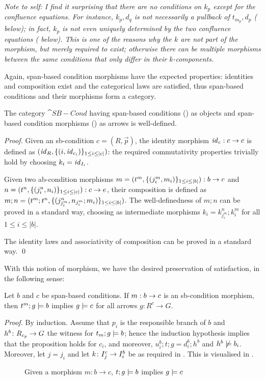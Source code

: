 \medskip\noindent
\emph{Note to self: I find it surprising that there are no conditions on $k_p$ except for the confluence equations. For instance, $k_p,d_q$ is \emph{not} necessarily a pullback of $t_{m_p},d_p$ ( below); in fact, $k_p$ is \emph{not even} uniquely determined by the two confluence equations ( below). This is one of the reasons why the $k$ are not part of the morphism, but merely required to exist; otherwise there can be multiple morphisms between the same conditions that only differ in their $k$-components.}

\medskip\noindent Again, span-based condition morphisms have the expected properties: identities and composition exist and the categorical laws are satisfied, thus span-based conditions and their morphisms form a category.

\begin{proposition}
  The category $\cat{SB-Cond}$ having span-based conditions () as objects and span-based condition morphisms () as arrows is well-defined.
\end{proposition}
 
\begin{proof}
  Given an sb-condition $c=(R,\vec p)$, the identity morphism $\mathit{id}_c:c\rightarrow c$ is defined as $(\mathit{id}_R,\{{(i,\mathit{id}_{c_i})}\}_{1\leq i\leq|c|})$: the required commutativity properties trivially hold by choosing $k_i=\mathit{id}_{I_i}$.
  
Given two ab-condition morphisms $m= (t^m,\{{(j^m_i,m_i)}\}_{1\leq i\leq |b|}):b\rightarrow c$ and $n = (t^n,\{{(j^n_i,n_i)}\}_{1\leq i\leq |c|}):c\rightarrow e$, their composition is defined as $m;n=(t^m;t^n,\{{(j^n_{j^m_i},n_{j^m_i};m_i)}\}_{1\leq i\leq |b|})$.
The well-definedness of $m;n$ can be proved in a standard way, choosing as intermediate morphisms $k_i=k^n_{j^m_i};k^m_i$ for all $1\leq i\leq |b|$.

The identity laws and associativity of composition can be proved in a standard way. \qed
\end{proof}
%
With this notion of morphism, we have the desired preservation of satisfaction, in the following sense:
%
\begin{proposition}
Let $b$ and $c$ be span-based conditions. If $m:b\rightarrow c$ is an sb-condition morphism, then $t^m;g\models b$ implies $g\models c$ for all arrows $g:R^c\to G$.
\end{proposition}
%
\emph{Proof.} By induction. Assume that $p_i$ is the responsible branch of $b$ and $h^b\colon R_{c_p}\rightarrow G$ the witness for $t_m;g\models b$; hence the induction hypothesis implies that the proposition holds for $c_i$, and moreover, $u^b_i;t;g=d^b_i;h^b$ and $h^b\not\models b_i$. Moreover, let $j=j_i$ and let $k\colon I^c_j\rightarrow I^b_i$ be as required in . This is visualised in .
%
\begin{figure}
  \centering
  
  \caption{Given a morphism $m:b\rightarrow c$, $t;g\models b$ implies $g\models c$}
\end{figure}

